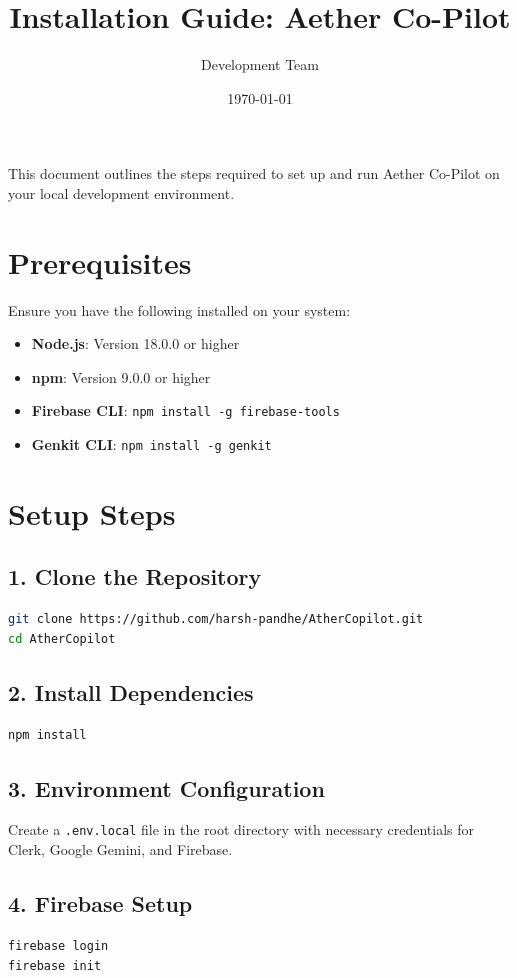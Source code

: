 \documentclass[12pt,a4paper]{article}
\title{Installation Guide: Aether Co-Pilot}
\author{Development Team}
\date{\today}
\begin{document}
\maketitle

This document outlines the steps required to set up and run Aether Co-Pilot on your local development environment.

\section{Prerequisites}
Ensure you have the following installed on your system:
\begin{itemize}
    \item \textbf{Node.js}: Version 18.0.0 or higher
    \item \textbf{npm}: Version 9.0.0 or higher
    \item \textbf{Firebase CLI}: \texttt{npm install -g firebase-tools}
    \item \textbf{Genkit CLI}: \texttt{npm install -g genkit}
\end{itemize}

\section{Setup Steps}

\subsection{1. Clone the Repository}
\begin{lstlisting}[language=bash]
git clone https://github.com/harsh-pandhe/AtherCopilot.git
cd AtherCopilot
\end{lstlisting}

\subsection{2. Install Dependencies}
\begin{lstlisting}[language=bash]
npm install
\end{lstlisting}

\subsection{3. Environment Configuration}
Create a \texttt{.env.local} file in the root directory with necessary credentials for Clerk, Google Gemini, and Firebase.

\subsection{4. Firebase Setup}
\begin{lstlisting}[language=bash]
firebase login
firebase init
\end{lstlisting}
\end{document}
